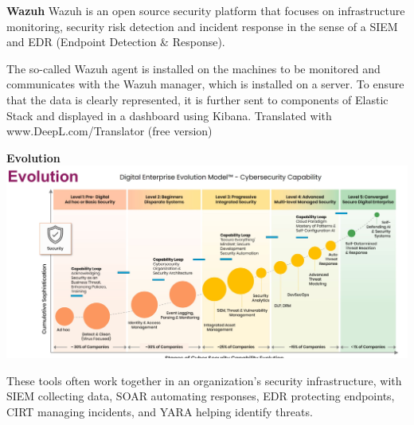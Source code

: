 \textbf{Wazuh}
Wazuh is an open source security platform that focuses on infrastructure monitoring, security risk detection and incident response in the sense of a SIEM and EDR (Endpoint Detection \& Response).

The so-called Wazuh agent is installed on the machines to be monitored and communicates with the Wazuh manager, which is installed on a server. To ensure that the data is clearly represented, it is further sent to components of Elastic Stack and displayed in a dashboard using Kibana. Translated with www.DeepL.com/Translator (free version)

\textbf{Evolution}
\includegraphics[width=\textwidth]{resources/04-evolution-cybersecurity-capabilities.png}

These tools often work together in an organization's security infrastructure, with SIEM collecting data, SOAR automating responses, EDR protecting endpoints, CIRT managing incidents, and YARA helping identify threats.

